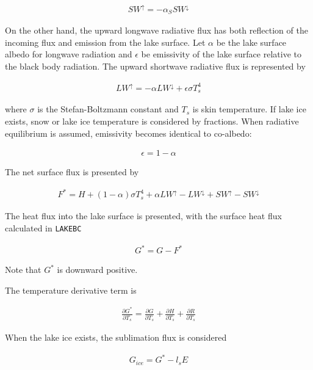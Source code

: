\begin{eqnarray}
    SW^\uparrow = - \alpha_S SW^\downarrow
\end{eqnarray}

On the other hand, the upward longwave radiative flux has both
reflection of the incoming flux and emission from the lake surface. Let
\(\alpha\) be the lake surface albedo for longwave radiation and
\(\epsilon\) be emissivity of the lake surface relative to the black
body radiation. The upward shortwave radiative flux is represented by

\begin{eqnarray}
    LW^\uparrow = - \alpha LW^\downarrow + \epsilon \sigma T_s ^4
\end{eqnarray}

where \(\sigma\) is the Stefan-Boltzmann constant and \(T_s\) is skin
temperature. If lake ice exists, snow or lake ice temperature is
considered by fractions. When radiative equilibrium is assumed,
emissivity becomes identical to co-albedo:

\begin{eqnarray}
    \epsilon = 1 - \alpha
\end{eqnarray}

The net surface flux is presented by

\begin{eqnarray}
    F^*=H + (1-\alpha)\sigma T_s^4 + \alpha LW^\uparrow - LW^\downarrow +SW^\uparrow - SW^\downarrow        
\end{eqnarray}

The heat flux into the lake surface is presented, with the surface heat
flux calculated in \texttt{LAKEBC}

\begin{eqnarray}
    G^* = G - F^*
\end{eqnarray}

Note that \(G^*\) is downward positive.

The temperature derivative term is

\begin{eqnarray}
    \frac{\partial G^*}{\partial T_s} = \frac{\partial G}{\partial T_s}+\frac{\partial H}{\partial T_s}+\frac{\partial R}{\partial T_s}
\end{eqnarray}

When the lake ice exists, the sublimation flux is considered

\begin{eqnarray}
    G_{ice} = G^* - l_s E
\end{eqnarray}

